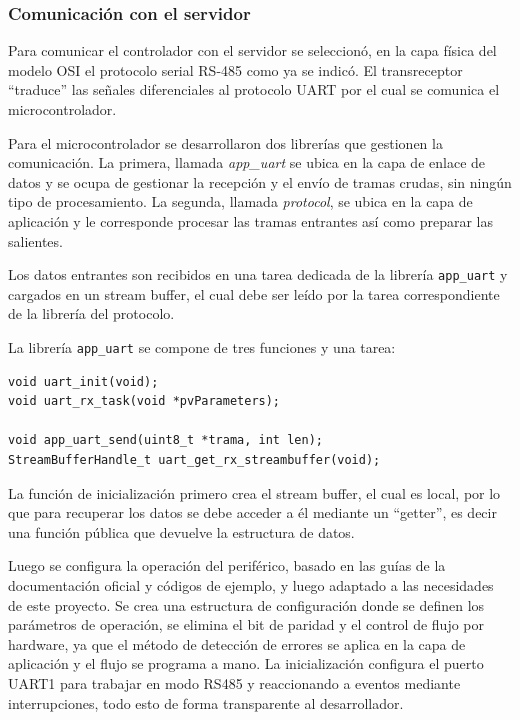 \subsubsection{Comunicación con el servidor}
Para comunicar el controlador con el servidor se seleccionó, en la capa física del modelo OSI el protocolo serial RS-485 como ya se indicó. El transreceptor \enquote{traduce} las señales diferenciales al protocolo UART por el cual se comunica el microcontrolador. 

Para el microcontrolador se desarrollaron dos librerías que gestionen la comunicación.
La primera, llamada \textit{app\_uart} se ubica en la capa de enlace de datos y se ocupa de gestionar la recepción y el envío de tramas crudas, sin ningún tipo de procesamiento.
La segunda, llamada \textit{protocol}, se ubica en la capa de aplicación y le  corresponde procesar las tramas entrantes así como preparar las salientes.

Los datos entrantes son recibidos en una tarea dedicada de la librería \texttt{app\_uart} y cargados en un stream buffer, el cual debe ser leído por la tarea correspondiente de la librería del protocolo.

La librería \texttt{app\_uart} se compone de tres funciones y una tarea:


\begin{minipage}{\linewidth}
\begin{lstlisting}
void uart_init(void);
void uart_rx_task(void *pvParameters);

void app_uart_send(uint8_t *trama, int len);
StreamBufferHandle_t uart_get_rx_streambuffer(void);

\end{lstlisting}
\end{minipage}

La función de inicialización primero crea el stream buffer, el cual es local, por lo que para recuperar los datos se debe acceder a él mediante un \enquote{getter}, es decir una función pública que devuelve la estructura de datos.

Luego se configura la operación del periférico, basado en las guías de la documentación oficial y códigos de ejemplo, y luego adaptado a las necesidades de este proyecto.
Se crea una estructura de configuración donde se definen los parámetros de operación, se elimina el bit de paridad y el control de flujo por hardware, ya que el método de detección de errores se aplica en la capa de aplicación y el flujo se programa a mano.
La inicialización configura el puerto UART1 para trabajar en modo RS485 y reaccionando a eventos mediante interrupciones, todo esto de forma transparente al desarrollador.

